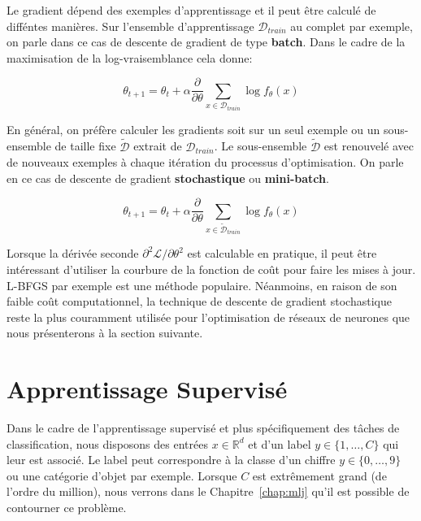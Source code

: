 Le gradient dépend des exemples d'apprentissage et il peut être calculé de
difféntes manières. Sur l'ensemble d'apprentissage $\mathcal{D}_{train}$ au
complet par exemple, on parle dans ce cas de descente de gradient de type
{\bf batch}. Dans le cadre de la maximisation de la log-vraisemblance cela donne:

\begin{equation}
\theta_{t+1} = \theta_{t} + \alpha \dfrac{\partial}{\partial\theta} \sum_{x\in\mathcal{D}_{train}}\log f_{\theta}(x)
\end{equation}

 En général, on préfère calculer les gradients soit sur un seul exemple ou un
 sous-ensemble de taille fixe $\tilde{\mathcal{D}}$ extrait de
 $\mathcal{D}_{train}$. Le sous-ensemble $\tilde{\mathcal{D}}$ est renouvelé
 avec de nouveaux exemples à chaque itération du processus d'optimisation. On
 parle en ce cas de descente de gradient {\bf stochastique} ou {\bf
 mini-batch}.

\begin{equation}
\theta_{t+1} = \theta_{t} + \alpha \dfrac{\partial}{\partial\theta} \sum_{x\in\tilde{\mathcal{D}}_{train}}\log f_{\theta}(x)
\end{equation}

Lorsque la dérivée seconde $\partial^{2}\mathcal{L}/\partial \theta^{2}$
est calculable en pratique, il peut être intéressant d'utiliser la courbure de la fonction de coût
pour faire les mises à jour. L-BFGS \citep{Byrd1995} par exemple est une méthode populaire.
Néanmoins, en raison de son faible coût computationnel, la technique de descente de gradient stochastique reste la plus
couramment utilisée pour l'optimisation de réseaux de neurones que nous présenterons à la section suivante. 

\section{Apprentissage Supervisé \label{sec:supervised}}

Dans le cadre de l'apprentissage supervisé et plus spécifiquement des tâches de classification, nous disposons des entrées
$x\in\mathbb{R}^{d}$ et d'un label $y\in\{1,\dots ,C\}$ qui leur est associé.
Le label peut correspondre à la classe d'un chiffre $y\in\{0,\dots ,9\}$ ou une
catégorie d'objet par exemple.  Lorsque $C$ est extrêmement grand (de l'ordre
du million), nous verrons dans le Chapitre~\ref{chap:mlj} qu'il est possible de
contourner ce problème.
 
